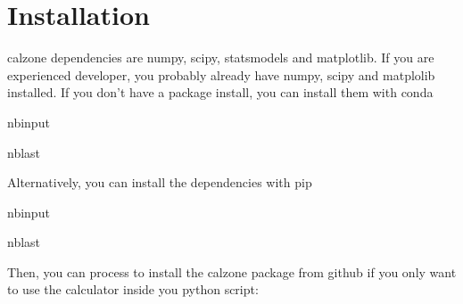 \documentclass[letterpaper,10pt,english]{sphinxmanual}
\begin{document}
\section{Installation}
\label{\detokenize{notebooks/quickstart:Installation}}
\sphinxAtStartPar
calzone dependencies are numpy, scipy, statsmodels and matplotlib. If you are experienced developer, you probably already have numpy, scipy and matplolib installed. If you don’t have a package install, you can install them with conda

\begin{sphinxuseclass}{nbinput}
\begin{sphinxuseclass}{nblast}
{
\begin{sphinxVerbatim}[commandchars=\\\{\}]
\llap{\color{nbsphinxin}[ ]:\,\hspace{\fboxrule}\hspace{\fboxsep}}  
  
  
  
\end{sphinxVerbatim}
}

\end{sphinxuseclass}
\end{sphinxuseclass}
\sphinxAtStartPar
Alternatively, you can install the dependencies with pip

\begin{sphinxuseclass}{nbinput}
\begin{sphinxuseclass}{nblast}
{
\begin{sphinxVerbatim}[commandchars=\\\{\}]
\llap{\color{nbsphinxin}[ ]:\,\hspace{\fboxrule}\hspace{\fboxsep}}  
  
  
  
\end{sphinxVerbatim}
}

\end{sphinxuseclass}
\end{sphinxuseclass}
\sphinxAtStartPar
Then, you can process to install the calzone package from github if you only want to use the calculator inside you python script:
\end{document}
